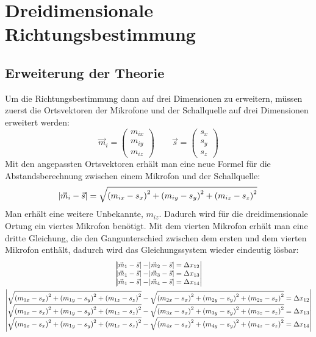 \section{Dreidimensionale Richtungsbestimmung}
\subsection{Erweiterung der Theorie}
Um die Richtungsbestimmung dann auf drei Dimensionen zu erweitern, müssen zuerst die Ortsvektoren der Mikrofone und der Schallquelle auf drei Dimensionen erweitert werden:
\begin{equation}
    \vec{m}_i = \begin{pmatrix}
        m_{ix} \\
        m_{iy} \\
        m_{iz}
    \end{pmatrix} \quad\quad
    \vec{s} = \begin{pmatrix}
        {s_x} \\
        {s_y} \\
        {s_z}
    \end{pmatrix}
\end{equation}
Mit den angepassten Ortsvektoren erhält man eine neue Formel für die Abstandsberechnung zwischen einem Mikrofon und der Schallquelle:
\begin{equation}
    \abs{\vec{m}_i - \vec{s}} = \sqrt{{(m_{ix} - s_x)}^2 + {(m_{iy} - s_y)}^2 + {(m_{iz} - s_z)}^2}
\end{equation}
Man erhält eine weitere Unbekannte, $m_{iz}$. Dadurch wird für die dreidimensionale Ortung ein viertes Mikrofon benötigt. Mit dem vierten Mikrofon erhält man eine dritte Gleichung, die den Gangunterschied zwischen dem ersten und dem vierten Mikrofon enthält, dadurch wird das Gleichungssystem wieder eindeutig lösbar:
\begin{gather*}
    \begin{vmatrix}
        \abs{\vec{m}_1 - \vec{s}} - \abs{\vec{m}_2 - \vec{s}} = \Delta{x_{12}} \\
        \abs{\vec{m}_1 - \vec{s}} - \abs{\vec{m}_3 - \vec{s}} = \Delta{x_{13}} \\
        \abs{\vec{m}_1 - \vec{s}} - \abs{\vec{m}_4 - \vec{s}} = \Delta{x_{14}}
    \end{vmatrix}\\
    \begin{vmatrix}
        \sqrt{{(m_{1x} - s_x)}^2 + {(m_{1y} - s_y)}^2 + {(m_{1z} - s_z)}^2} - \sqrt{{(m_{2x} - s_x)}^2 + {(m_{2y} - s_y)}^2 + {(m_{2z} - s_z)}^2} = \Delta{x_{12}} \\
        \sqrt{{(m_{1x} - s_x)}^2 + {(m_{1y} - s_y)}^2 + {(m_{1z} - s_z)}^2} - \sqrt{{(m_{3x} - s_x)}^2 + {(m_{3y} - s_y)}^2 + {(m_{3z} - s_z)}^2} = \Delta{x_{13}} \\
        \sqrt{{(m_{1x} - s_x)}^2 + {(m_{1y} - s_y)}^2 + {(m_{1z} - s_z)}^2} - \sqrt{{(m_{4x} - s_x)}^2 + {(m_{4y} - s_y)}^2 + {(m_{4z} - s_z)}^2} = \Delta{x_{14}}
    \end{vmatrix}
\end{gather*}
